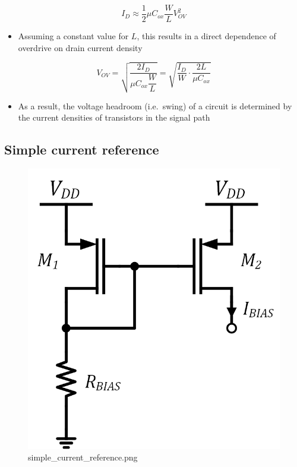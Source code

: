 \documentclass[11pt]{article}
\providecommand{\tightlist}{%
      \setlength{\itemsep}{0pt}\setlength{\parskip}{0pt}}
\begin{document}
\begin{equation}
I_D \approx \dfrac{1}{2}\mu C_{ox} \dfrac{W}{L}V_{OV}^2
\end{equation}

\begin{itemize}
\tightlist
\item
  Assuming a constant value for \(L\), this results in a direct
  dependence of overdrive on drain current density
\end{itemize}

\begin{equation}
V_{OV} = \sqrt{\dfrac{2I_D}{\mu C_{ox} \dfrac{W}{L}}} = \sqrt{\dfrac{I_D}{W}\cdot\dfrac{2L}{\mu C_{ox}}}
\end{equation}

\begin{itemize}
\tightlist
\item
  As a result, the voltage headroom (i.e.~swing) of a circuit is
  determined by the current densities of transistors in the signal path
\end{itemize}

    \hypertarget{simple-current-reference}{%
\subsection{Simple current reference}\label{simple-current-reference}}

    \begin{figure}
\centering
\includegraphics{simple_current_reference.png}
\caption{simple\_current\_reference.png}
\end{figure}
\end{document}
